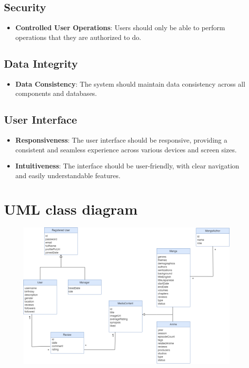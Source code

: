\subsection*{Security}

\begin{itemize}
    \item \textbf{Controlled User Operations}: Users should only be able to perform operations that they are authorized to do.
\end{itemize}

\subsection*{Data Integrity}

\begin{itemize}
    \item \textbf{Data Consistency}: The system should maintain data consistency across all components and databases.
\end{itemize}

\subsection*{User Interface}

\begin{itemize}
    \item \textbf{Responsiveness}: The user interface should be responsive, providing a consistent and seamless experience across various devices and screen sizes.
    
    \item \textbf{Intuitiveness}: The interface should be user-friendly, with clear navigation and easily understandable features.
\end{itemize}

\section{UML class diagram}

\begin{figure}[h]\label{uml class diagram}
    \centering
    \includegraphics[width=\linewidth]{Media/Class Diagram.png}
\end{figure}

